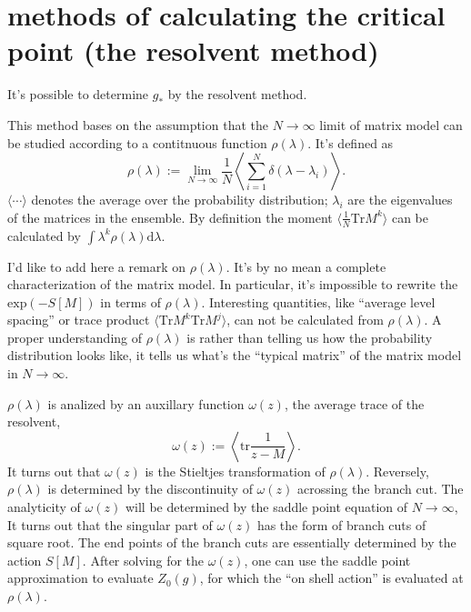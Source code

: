 \section{methods of calculating the critical point (the resolvent method)}
It's possible to determine $g_*$ by the resolvent method.

This method bases on the assumption that
the $N\to\infty$ limit of matrix model can be studied according to a contitnuous function $\rho(\lambda)$.
It's defined as
\begin{equation*}
    \rho(\lambda) := \lim_{N\to\infty} \frac{1}{N}\left\langle \sum_{i=1}^N \delta(\lambda - \lambda_i) \right\rangle.
\end{equation*}
$\langle\cdots\rangle$ denotes the average over the probability distribution;
$\lambda_i$ are the eigenvalues of the matrices in the ensemble.
By definition the moment $\langle \frac{1}{N} \mathrm{Tr} M^k \rangle$ can be calculated by $\int \lambda^k \rho(\lambda)\mathrm{d}\lambda$.

I'd like to add here a remark on $\rho(\lambda)$.
It's by no mean a complete characterization of the matrix model.
In particular, it's impossible to rewrite the $\mathrm{exp}(-S[M])$ in terms of $\rho(\lambda)$.
Interesting quantities, like ``average level spacing'' or trace product $\langle\mathrm{Tr} M^k \mathrm{Tr} M^j\rangle$, can not be calculated from $\rho(\lambda)$.
A proper understanding of $\rho(\lambda)$ is
rather than telling us how the probability distribution looks like,
it tells us what's the ``typical matrix'' of the matrix model in $N\to\infty$.

$\rho(\lambda)$ is analized by an auxillary function $\omega(z)$, the average trace of the resolvent,
\begin{equation}
	\omega(z) := \left\langle \mathrm{tr}\frac{1}{z - M} \right\rangle
.\end{equation}
It turns out that $\omega(z)$ is the Stieltjes transformation of $\rho(\lambda)$.
Reversely, $\rho(\lambda)$ is determined by the discontinuity of $\omega(z)$ acrossing the branch cut.
The analyticity of $\omega(z)$ will be determined by the saddle point equation of $N\to\infty$,
It turns out that the singular part of $\omega(z)$ has the form of branch cuts of square root.
The end points of the branch cuts are essentially determined by the action $S[M]$.
After solving for the $\omega(z)$,
one can use the saddle point approximation to evaluate $Z_0(g)$,
for which the ``on shell action'' is evaluated at $\rho(\lambda)$. 

